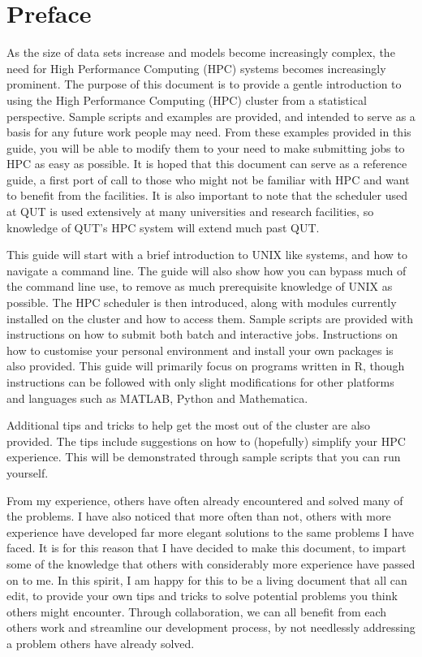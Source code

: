 \section*{Preface}
As the size of data sets increase and models become increasingly complex, the need for High Performance Computing (HPC) systems becomes increasingly prominent. The purpose of this document is to provide a gentle introduction to using the High Performance Computing (HPC) cluster from a statistical perspective. Sample scripts and examples are provided, and intended to serve as a basis for any future work people may need. From these examples provided in this guide, you will be able to modify them to your need to make submitting jobs to HPC as easy as possible. It is hoped that this document can serve as a reference guide, a first port of call to those who might not be familiar with HPC and want to benefit from the facilities. It is also important to note that the scheduler used at QUT is used extensively at many universities and research facilities, so knowledge of QUT's HPC system will extend much past QUT.
%
%
\par
%
%
This guide will start with a brief introduction to UNIX like systems, and how to navigate a command line. The guide will also show how you can bypass much of the command line use, to remove as much prerequisite knowledge of UNIX as possible. The HPC scheduler is then introduced, along with modules currently installed on the cluster and how to access them. Sample scripts are provided with instructions on how to submit both batch and interactive jobs. Instructions on how to customise your personal environment and install your own packages is also provided. This guide will primarily focus on programs written in R, though instructions can be followed with only slight modifications for other platforms and languages such as MATLAB, Python and Mathematica.
%
%
\par
%
%
Additional tips and tricks to help get the most out of the cluster are also provided. The tips include suggestions on how to (hopefully) simplify your HPC experience. This will be demonstrated through sample scripts that you can run yourself.
%
%
\par
%
%
From my experience, others have often already encountered and solved many of the problems. I have also noticed that more often than not, others with more experience have developed far more elegant solutions to the same problems I have faced. It is for this reason that I have decided to make this document, to impart some of the knowledge that others with considerably more experience have passed on to me. In this spirit, I am happy for this to be a living document that all can edit, to provide your own tips and tricks to solve potential problems you think others might encounter. Through collaboration, we can all benefit from each others work and streamline our development process, by not needlessly addressing a problem others have already solved.
%
%
%
%